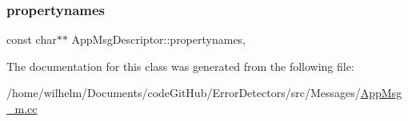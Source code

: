 \subsubsection{\texorpdfstring{propertynames}{propertynames}}
{\footnotesize\ttfamily const char$\ast$$\ast$ App\+Msg\+Descriptor\+::propertynames\hspace{0.3cm}{\ttfamily [mutable]}, {\ttfamily [private]}}



The documentation for this class was generated from the following file\+:\begin{DoxyCompactItemize}
\item 
/home/wilhelm/\+Documents/code\+Git\+Hub/\+Error\+Detectors/src/\+Messages/\hyperlink{_app_msg__m_8cc}{App\+Msg\+\_\+m.\+cc}\end{DoxyCompactItemize}
